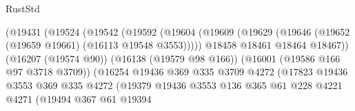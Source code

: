 \begin{lexlean}{RustStd}
\begin{coremodule}
                                          (@19431
                                            (@19524
                                              (@19542
                                                (@19592
                                                  (@19604
                                                    (@19609
                                                      (@19629
                                                        (@19646
                                                          (@19652
                                                            (@19659 @19661)
                                                            (@16113 @19548 @3553)))))
                                                    @18458
                                                    @18461
                                                    @18464
                                                    @18467))
                                                (@16207 (@19574 @90))
                                                (@16138 (@19579 @98 @166))
                                                (@16001 (@19586 @166 @97 @3718 @3709))
                                                (@16254
                                                  @19436
                                                  @369
                                                  @335
                                                  @3709
                                                  @4272
                                                  (@17823
                                                    @19436
                                                    @3553
                                                    @369
                                                    @335
                                                    @4272
                                                    (@19379
                                                      @19436
                                                      @3553
                                                      @136
                                                      @365
                                                      @61
                                                      @228
                                                      @4221
                                                      @4271
                                                      (@19494
                                                        @367
                                                        @61
                                                        @19394

\end{coremodule}
\end{lexlean}
